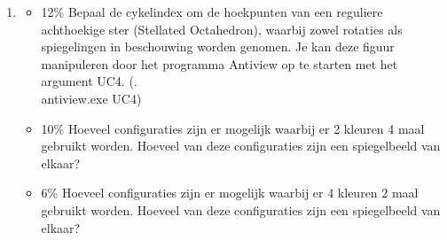 \documentclass{article}
\def\note#1{\color{cyan} #1 \color{black}}
\begin{document}
\begin{enumerate}
{    }

  \item {\begin{itemize}
      \item {\note{12\%} Bepaal de cykelindex om de hoekpunten van een reguliere achthoekige ster (Stellated Octahedron), waarbij zowel rotaties als spiegelingen in beschouwing worden genomen. Je kan deze figuur manipuleren door het programma Antiview op te starten met het argument UC4. (.\\antiview.exe UC4)}
      \item {\note{10\%} Hoeveel configuraties zijn er mogelijk waarbij er 2 kleuren 4 maal gebruikt worden. Hoeveel van deze configuraties zijn een spiegelbeeld van elkaar?}
        \item {\note{6\%} Hoeveel configuraties zijn er mogelijk waarbij er 4 kleuren 2 maal gebruikt worden. Hoeveel van deze configuraties zijn een spiegelbeeld van elkaar?}
      \end{itemize}}
\end{enumerate}
\end{document}
